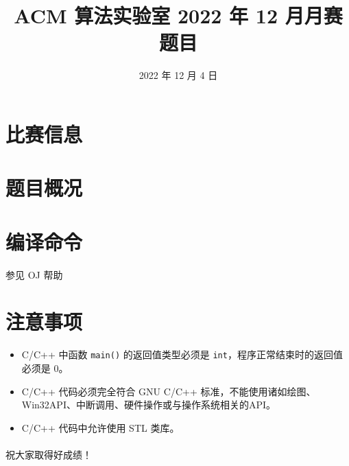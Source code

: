 \documentclass{../cpct/ctpro}
\title{ACM 算法实验室 2022 年 12 月月赛题目}
\date{2022 年 12 月 4 日}
\begin{document}
\maketitle
{}

\section*{比赛信息}


\section*{题目概况}

\problemtab

\section*{编译命令}

参见 OJ 帮助

\section*{注意事项}

\begin{itemize}
    \item C/C++ 中函数 \lstinline{main()} 的返回值类型必须是 \lstinline{int}，程序正常结束时的返回值必须是 $0$。
    \item C/C++ 代码必须完全符合 GNU C/C++ 标准，不能使用诸如绘图、Win32API、中断调用、硬件操作或与操作系统相关的API。
    \item C/C++ 代码中允许使用 STL 类库。
\end{itemize}

\paragraph*{} 祝大家取得好成绩！
\end{document}
